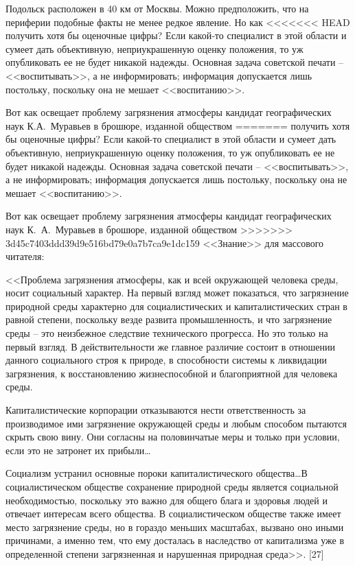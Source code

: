 \documentclass{book}
\begin{document}
Подольск расположен в 40 км от Москвы. Можно предположить, что на периферии подобные факты не менее редкое явление. Но как 
<<<<<<< HEAD
получить хотя бы оценочные цифры? Если какой‑то специалист в этой области и сумеет дать объективную, неприукрашенную оценку 
положения, то уж опубликовать ее не будет никакой надежды. Основная задача советской печати -- <<воспитывать>>, а не 
информировать; информация допускает­ся лишь постольку, поскольку она не мешает <<воспитанию>>.

Вот как освещает проблему загрязнения атмосферы кандидат географических наук К.А.~Муравьев в брошюре, изданной обществом 
=======
получить хотя бы оценочные цифры? Если какой-то специалист в этой области и сумеет дать объективную, неприукрашенную оценку 
положения, то уж опубликовать ее не будет никакой надежды. Основная задача советской печати -- <<воспитывать>>, а не 
информировать; информация допускает­ся лишь постольку, поскольку она не мешает <<воспитанию>>.

Вот как освещает проблему загрязнения атмосферы кандидат географических наук К.~А.~Муравьев в брошюре, изданной обществом 
>>>>>>> 3d45c7403ddd39d9e516bd79e0a7b7ca9e1dc159
<<Знание>> для массового читателя:

<<Проблема загрязнения атмосферы, как и всей окружающей человека среды, носит социальный характер. На первый взгляд может 
показаться, что загрязнение природной среды характерно для социалистических и капиталистических стран в равной степени, 
поскольку везде развита промышленность, и что загрязнение среды -- это неизбежное следствие технического прогресса. Но это 
только на первый взгляд. В действительности же главное различие состоит в отношении данного социального строя к природе, в 
способности системы к ликвидации загрязнения, к восстановлению жизнеспособной и благоприятной для человека среды.

Капиталистические корпорации отказываются нести ответственность за производимое ими загрязнение окружающей среды и любым 
способом пытаются скрыть свою вину. Они согласны на половинчатые меры и только при условии, если это не затронет их 
прибыли\ldots

Социализм устранил основные пороки капиталистического общества\ldots В социалистическом обществе сохранение природной среды 
является социальной необходимостью, поскольку это важно для общего блага и здоровья людей и отвечает инте­ресам всего общества. В 
социалистическом обществе также имеет место загрязнение среды, но в гораздо меньших масштабах, вызвано оно иными причинами, а 
именно тем, что ему досталась в наследство от капитализма уже в определенной степени загрязненная и нарушенная природная 
среда>>. [27]
\end{document}
